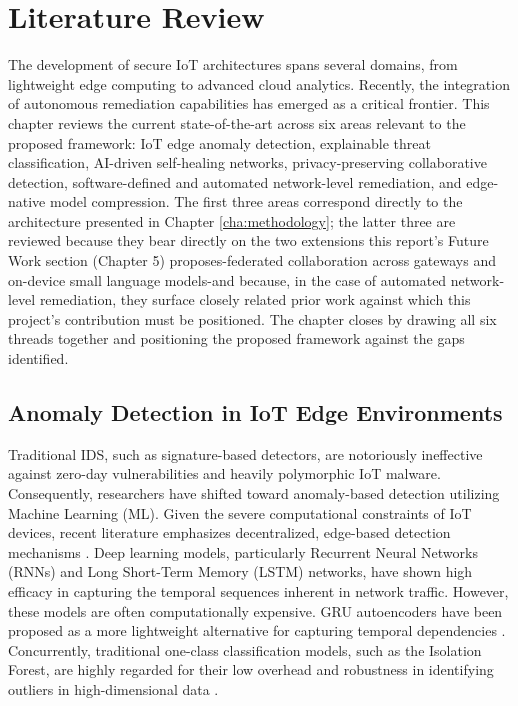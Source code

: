 \chapter{Literature Review}\label{cha:literature_review}

The development of secure IoT architectures spans several domains, from lightweight edge computing to advanced cloud analytics. Recently, the integration of autonomous remediation capabilities has emerged as a critical frontier. This chapter reviews the current state-of-the-art across six areas relevant to the proposed framework: IoT edge anomaly detection, explainable threat classification, AI-driven self-healing networks, privacy-preserving collaborative detection, software-defined and automated network-level remediation, and edge-native model compression. The first three areas correspond directly to the architecture presented in Chapter \ref{cha:methodology}; the latter three are reviewed because they bear directly on the two extensions this report's Future Work section (Chapter 5) proposes-federated collaboration across gateways and on-device small language models-and because, in the case of automated network-level remediation, they surface closely related prior work against which this project's contribution must be positioned. The chapter closes by drawing all six threads together and positioning the proposed framework against the gaps identified.

\section{Anomaly Detection in IoT Edge Environments}

Traditional IDS, such as signature-based detectors, are notoriously ineffective against zero-day vulnerabilities and heavily polymorphic IoT malware. Consequently, researchers have shifted toward anomaly-based detection utilizing Machine Learning (ML). Given the severe computational constraints of IoT devices, recent literature emphasizes decentralized, edge-based detection mechanisms \cite{Gamlo2026}. Deep learning models, particularly Recurrent Neural Networks (RNNs) and Long Short-Term Memory (LSTM) networks, have shown high efficacy in capturing the temporal sequences inherent in network traffic. However, these models are often computationally expensive. GRU autoencoders have been proposed as a more lightweight alternative for capturing temporal dependencies \cite{Yao2023}. Concurrently, traditional one-class classification models, such as the Isolation Forest, are highly regarded for their low overhead and robustness in identifying outliers in high-dimensional data \cite{Liu2008}.

